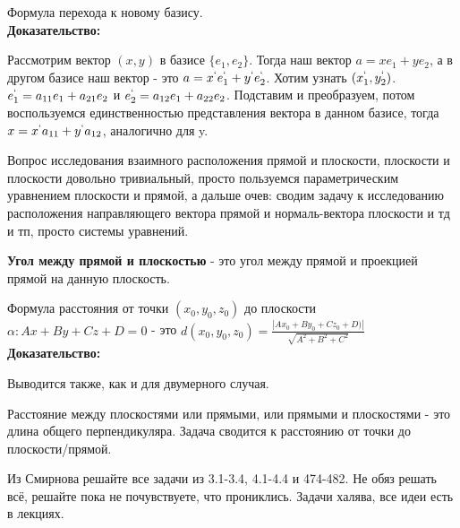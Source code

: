 \documentclass[12pt]{article}
\begin{document}
\begin{theorembox}
Формула перехода к новому базису.\\

\textbf{Доказательство:}

Рассмотрим вектор $(x, y)$ в базисе $\{e_1, e_2\}$. Тогда наш вектор $a = xe_1 + ye_2$, а в другом базисе наш вектор - это $a = x^`e^`_1 + y^`e^`_2$. Хотим узнать $(x^`_1, y^`_2)$. $e^`_1 = a_{11}e_1 + a_{21}e_2$ и $e^`_2 = a_{12}e_1 + a_{22}e_2$. Подставим и преобразуем, потом воспользуемся единственностью представления вектора в данном базисе, тогда $x = x^`a_{11} + y^`a_{12}$, аналогично для y.
\end{theorembox}

\begin{remarkbox}
Вопрос исследования взаимного расположения прямой и плоскости, плоскости и плоскости довольно тривиальный, просто пользуемся параметрическим уравнением плоскости и прямой, а дальше очев: сводим задачу к исследованию расположения направляющего вектора прямой и нормаль-вектора плоскости и тд и тп, просто системы уравнений.
\end{remarkbox}

\begin{definitionbox}
\textbf{Угол между прямой и плоскостью} - это угол между прямой и проекцией прямой на данную плоскость.
\end{definitionbox}

\begin{theorembox}
Формула расстояния от точки $(x_0, y_0, z_0)$ до плоскости $\alpha: Ax + By + Cz + D = 0$ - это $d(x_0, y_0, z_0) = \frac{|Ax_0 + By_0 + Cz_0 + D)|}{\sqrt{A^2 + B^2 + C^2}}$\\

\textbf{Доказательство:}

Выводится также, как и для двумерного случая.
\end{theorembox}

\begin{remarkbox}
Расстояние между плоскостями или прямыми, или прямыми и плоскостями - это длина общего перпендикуляра. Задача сводится к расстоянию от точки до плоскости/прямой.
\end{remarkbox}

\begin{homeworkbox}
    Из Смирнова решайте все задачи из 3.1-3.4, 4.1-4.4 и 474-482. Не обяз решать всё, решайте пока не почувствуете, что прониклись. Задачи халява, все идеи есть в лекциях.
\end{homeworkbox}
\end{document}
